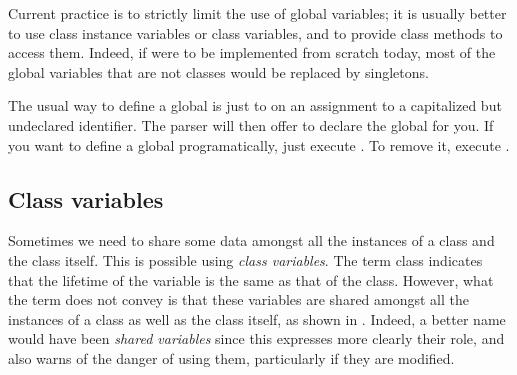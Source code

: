 \documentclass[a4paper,10pt,twoside]{book}
\begin{document}
Current practice is to strictly limit the use of global variables; it is usually better to use class instance variables or class variables, and to provide class methods to access them.  Indeed, if \squeak were to be implemented from scratch today, most of the global variables that are not classes would be replaced by singletons.

The usual way to define a global is just to  on an assignment to a capitalized but undeclared identifier.  The parser will then offer to declare the global for you.  If you want to define a global programatically, just execute .  To remove it, execute .

\subsection{Class variables}
\label{sec:classVars}

Sometimes we need to share some data amongst all the instances of a 
class and the class itself.
This is possible using \emph{class variables}. 
The term class  indicates that the lifetime of the variable is the same as that of the class. However, what the
term does not convey is that these variables are shared amongst all the instances of a class as well as the class itself,
as shown in .
Indeed, a better name would have been \emph{shared variables} since this expresses more clearly their role, and also warns of the danger of using them, particularly if they are modified.
\end{document}
